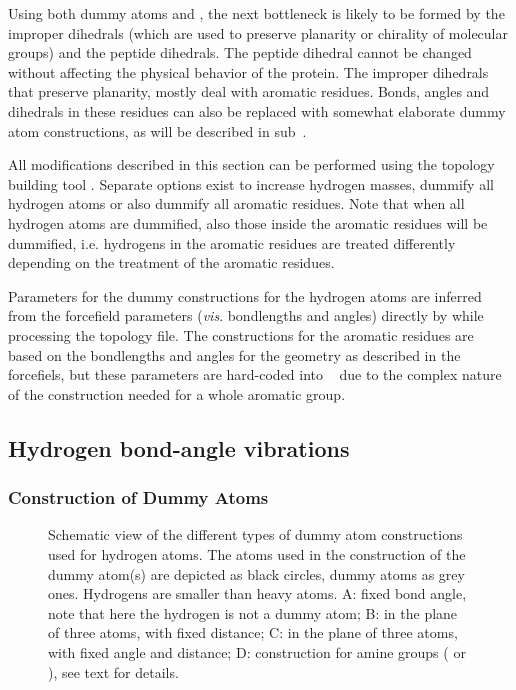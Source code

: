 Using both dummy atoms and , the next
bottleneck is likely to be formed by the improper dihedrals (which are
used to preserve planarity or chirality of molecular groups) and the
peptide dihedrals. The peptide dihedral cannot be changed without
affecting the physical behavior of the protein. The improper dihedrals
that preserve planarity, mostly deal with aromatic residues. Bonds,
angles and dihedrals in these residues can also be replaced with
somewhat elaborate dummy atom constructions, as will be described in
sub~.

All modifications described in this section can be performed using the
{\gromacs} topology building tool {\tt {}}. Separate
options exist to increase hydrogen masses, dummify all hydrogen atoms
or also dummify all aromatic residues. Note that when all hydrogen
atoms are dummified, also those inside the aromatic residues will be
dummified, i.e. hydrogens in the aromatic residues are treated
differently depending on the treatment of the aromatic residues.

Parameters for the dummy constructions for the hydrogen atoms are
inferred from the forcefield parameters ({\em vis}. bondlengths and
angles) directly by {\tt {}} while processing the
topology file.  The constructions for the aromatic residues are based
on the bondlengths and angles for the geometry as described in the
forcefiels, but these parameters are hard-coded into {\tt
{}} due to the complex nature of the construction
needed for a whole aromatic group.

\subsection{Hydrogen bond-angle vibrations}
\label{sec:dummyhydro}
\subsubsection{Construction of Dummy Atoms} %
\begin{figure}
\centerline{}
\caption[Schematic view of the different types of dummy atom
constructions used for hydrogen atoms.]{Schematic view of the
different types of dummy atom constructions used for hydrogen
atoms. The atoms used in the construction of the dummy atom(s) are
depicted as black circles, dummy atoms as grey ones. Hydrogens are
smaller than heavy atoms. {\sf A}: fixed bond angle, note that here
the hydrogen is not a dummy atom; {\sf B}: in the plane of three
atoms, with fixed distance; {\sf C}: in the plane of three atoms, with
fixed angle and distance; {\sf D}: construction for amine groups
({\amine} or {\aminep}), see text for details.}
\label{fig:dumhydro}
\end{figure}

